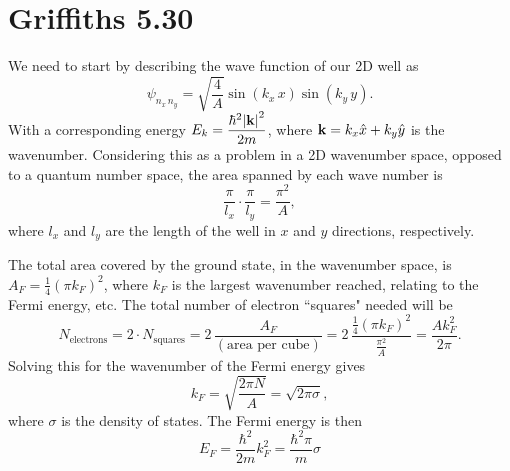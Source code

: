 \documentclass[11pt]{article}
\begin{document}
\newpage

\section*{Griffiths 5.30}
We need to start by describing the wave function of our 2D well as
\[\psi_{n_x \, n_y} = \sqrt{\frac{4}{A}}\sin(k_x \, x)\sin(k_y \, y).\]
With a corresponding energy $\displaystyle{E_k = \frac{\hbar^2\abs{\vb{k}}^2}{2m}}$, where $\vb{k} = k_x\hat{x}+k_y\hat{y}$ is the wavenumber. Considering this as a problem in a 2D wavenumber space, opposed to a quantum number space, the area spanned by each wave number is
\[\frac{\pi}{l_x} \cdot \frac{\pi}{l_y} = \frac{\pi^2}{A},\]
where $l_x$ and $l_y$ are the length of the well in $x$ and $y$ directions, respectively. 

The total area covered by the ground state, in the wavenumber space, is $\displaystyle{A_F = \frac{1}{4}\left(\pi k_F\right)^2}$, where $k_F$ is the largest wavenumber reached, relating to the Fermi energy, etc. The total number of electron ``squares" needed will be 
\[N_{\text{electrons}} = 2 \cdot N_{\text{squares}} = 2 \, \frac{A_F}{(\text{area per cube})} = 2 \, \frac{\frac{1}{4}\left(\pi k_F\right)^2}{\frac{\pi^2}{A}} = \frac{A k^2_F}{2\pi}.\]
Solving this for the wavenumber of the Fermi energy gives
\[k_F = \sqrt{\frac{2\pi N}{A}} = \sqrt{2\pi \sigma},\]
where $\sigma$ is the density of states. The Fermi energy is then
\[E_F = \frac{\hbar^2}{2m}k_F^2 = \boxed{\frac{\hbar^2 \pi}{m}\sigma}\]

\newpage
\end{document}
